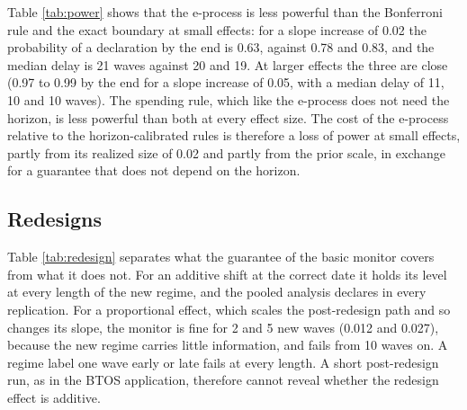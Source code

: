 \documentclass[Afour,sageh,times]{sagej}
\theoremstyle{definition}
\begin{document}
\begin{table}[t]
\small\centering
\caption{Takeoff detection when the growth rate rises by the stated amount (percentage points per wave) at the 25th of 54 waves, from a baseline growth of 0.10. Each cell gives the probability of a first declaration within 20 waves of the change, the probability of one by the end of the series, and the median delay in waves among the paths detected. The probability of a declaration before the change is 0.012 to 0.015 for the e-process and the Bonferroni rule, 0.04 for the spending rule and 0.03 for the exact boundary.}
\label{tab:power}

\end{table}

Table \ref{tab:power} shows that the e-process is less powerful than the Bonferroni rule and the exact boundary at small effects: for a slope increase of 0.02 the probability of a declaration by the end is 0.63, against 0.78 and 0.83, and the median delay is 21 waves against 20 and 19. At larger effects the three are close (0.97 to 0.99 by the end for a slope increase of 0.05, with a median delay of 11, 10 and 10 waves). The spending rule, which like the e-process does not need the horizon, is less powerful than both at every effect size. The cost of the e-process relative to the horizon-calibrated rules is therefore a loss of power at small effects, partly from its realized size of 0.02 and partly from the prior scale, in exchange for a guarantee that does not depend on the horizon.

\subsection{Redesigns}
\label{sec:redesignsim}

\begin{table}[t]
\small\centering
\caption{Probability of a false declaration of the basic monitor after a redesign at the 21st wave, with 2, 5, 10 or 20 waves in the new regime, on a linear path of slope 0.25. The additive shift is 7.3 points; the multiplicative effect scales the series by 1.73; in the next two columns the shift is additive but the regime label is placed one wave before or after the true change. The last column is the pooled analysis with an additive shift. 3,000 replications (5,000 for the pooled analysis).}
\label{tab:redesign}

\end{table}

Table \ref{tab:redesign} separates what the guarantee of the basic monitor covers from what it does not. For an additive shift at the correct date it holds its level at every length of the new regime, and the pooled analysis declares in every replication. For a proportional effect, which scales the post-redesign path and so changes its slope, the monitor is fine for 2 and 5 new waves (0.012 and 0.027), because the new regime carries little information, and fails from 10 waves on. A regime label one wave early or late fails at every length. A short post-redesign run, as in the BTOS application, therefore cannot reveal whether the redesign effect is additive.
\end{document}
